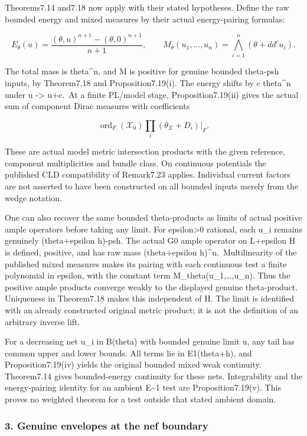 \documentclass[
  10pt,
]{article}
\begin{document}
Theorems7.14 and7.18 now apply with their stated hypotheses. Define the
raw bounded energy and mixed measures by their actual energy-pairing
formulas:

\[E_\theta(u)=\frac{(\theta,u)^{n+1}-(\theta,0)^{n+1}}{n+1},\qquad
M_\theta(u_1,\ldots,u_n)=\bigwedge_{i=1}^n(\theta+dd^cu_i).\]

The total mass is theta\^{}n, and M is positive for genuine bounded
theta-psh inputs, by Theorem7.18 and Proposition7.19(i). The energy
shifts by c theta\^{}n under u -\textgreater{} u+c.~At a finite PL/model
stage, Proposition7.19(ii) gives the actual sum of component Dirac
measures with coefficients

\[\operatorname{ord}_F(\mathcal X_0)\prod_i(\theta_{\mathcal X}+D_i)|_F.\]

These are actual model metric intersection products with the given
reference, component multiplicities and bundle class. On continuous
potentials the published CLD compatibility of Remark7.23 applies.
Individual current factors are not asserted to have been constructed on
all bounded inputs merely from the wedge notation.

One can also recover the same bounded theta-products as limits of actual
positive ample operators before taking any limit. For
epsilon\textgreater0 rational, each u\_i remains genuinely
(theta+epsilon h)-psh. The actual G0 ample operator on L+epsilon H is
defined, positive, and has raw mass (theta+epsilon
h)\^{}n.~Multilinearity of the published mixed measures makes its
pairing with each continuous test a finite polynomial in epsilon, with
the constant term M\_theta(u\_1,\ldots,u\_n). Thus the positive ample
products converge weakly to the displayed genuine theta-product.
Uniqueness in Theorem7.18 makes this independent of H. The limit is
identified with an already constructed original metric product; it is
not the definition of an arbitrary inverse lift.

For a decreasing net u\_i in B(theta) with bounded genuine limit u, any
tail has common upper and lower bounds. All terms lie in E1(theta+h),
and Proposition7.19(iv) yields the original bounded mixed weak
continuity. Theorem7.14 gives bounded-energy continuity for these nets.
Integrability and the energy-pairing identity for an ambient
E\textasciitilde1 test are Proposition7.19(v). This proves no weighted
theorem for a test outside that stated ambient domain.

\subsubsection{3. Genuine envelopes at the nef
boundary}\label{genuine-envelopes-at-the-nef-boundary}
\end{document}
